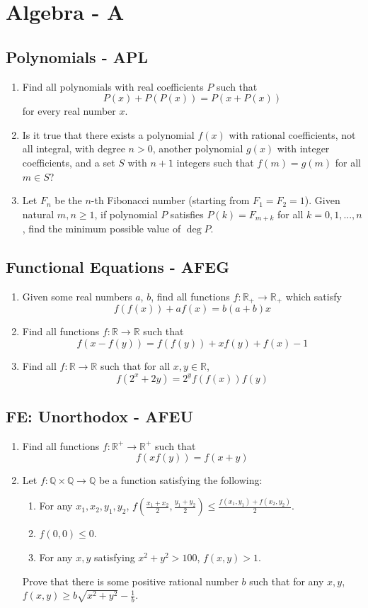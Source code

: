 \documentclass[a4paper]{article}
\title{\thisTitle}
\author{National Team 2017-2018}
\date{\thisDate}
\newcommand{\sct}{\section}
\newcommand{\ssct}{\subsection}
\newcommand{\be}{\begin{enumerate}}
\newcommand{\ee}{\end{enumerate}}
\begin{document}
\thispagestyle{fancy}
\sct*{Algebra - A}
\ssct*{Polynomials - APL}
\be
	\item Find all polynomials with real coefficients $P$ such that
	\[P(x) + P(P(x)) = P(x+P(x))\]
	for every real number $x$.
	\item Is it true that there exists a polynomial $f(x)$ with rational coefficients, not all integral, with degree $n > 0$, another polynomial $g(x)$ with integer coefficients, and a set $S$ with $n+1$ integers such that $f(m) = g(m)$ for all $m \in S$?

    \item Let $F_n$ be the $n$-th Fibonacci number (starting from $F_1=F_2=1$). Given natural $m,n\ge 1$, if polynomial $P$ satisfies $P(k)=F_{m+k}$ for all $k=0,1,...,n$, find the minimum possible value of $\deg P$.
\ee
\ssct*{Functional Equations - AFEG}
\be
	\item Given some real numbers $a$, $b$, find all functions $f: \mathbb{R}_+\rightarrow\mathbb{R}_+$ which satisfy
	\[f(f(x))+af(x)=b(a+b)x\]
	\item Find all functions $f: \mathbb{R}\rightarrow\mathbb{R}$ such that
	\[f(x-f(y))=f(f(y))+xf(y)+f(x)-1\]

    \item Find all $f:\mathbb{R}\rightarrow \mathbb{R}$ such that for all $x,y\in\mathbb{R}$,
    $$f(2^x+2y) = 2^yf(f(x))f(y)$$
\ee

\ssct*{FE: Unorthodox - AFEU}
\be
	\item Find all functions $f: \mathbb{R^+}\rightarrow\mathbb{R^+}$ such that
    \[f(xf(y)) = f(x+y)\]

    \item Let $f:\mathbb{Q}\times\mathbb{Q}\rightarrow\mathbb{Q}$ be a function satisfying the following:
    \begin{enumerate}
        \item For any $x_1,x_2,y_1,y_2$, $f(\frac{x_1+x_2}{2},\frac{y_1+y_2}{2}) \le \frac{f(x_1,y_1)+f(x_2,y_2)}{2}$.
        \item $f(0,0) \le 0$.
        \item For any $x,y$ satisfying $x^2+y^2>100$, $f(x,y)>1$.
    \end{enumerate}
    Prove that there is some positive rational number $b$ such that for any $x,y$, $f(x,y) \ge b\sqrt{x^2+y^2} - \frac{1}{b}$.
\ee
\end{document}
